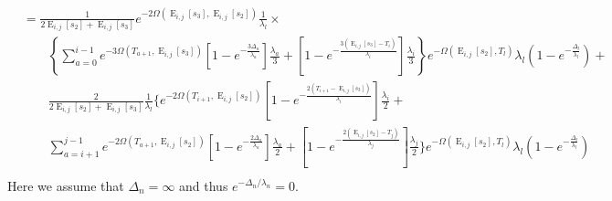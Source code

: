 \documentclass{article}
\DeclareMathOperator{\E}{E}
\begin{document}
\begin{align*}
    &=\frac{1}{2\E_{i,j}[s_2]+\E_{i,j}[s_3]}e^{-2\Omega(\E_{i,j}[s_3],\E_{i,j}[s_2])}\frac{1}{\lambda_l}\times\\
    &\qquad\left\{\sum_{a=0}^{i-1}e^{-3\Omega(T_{a+1},\E_{i,j}[s_3])}
        \left[1-e^{-\frac{3\Delta_a}{\lambda_a}}\right]\frac{\lambda_a}{3}+
    \left[1-e^{-\frac{3\left(\E_{i,j}[s_3]-T_i\right)}{\lambda_i}}\right]
    \frac{\lambda_i}{3}\right\}
    e^{-\Omega(\E_{i,j}[s_2], T_l)}\lambda_l\left(1-e^{-\frac{\Delta_l}{\lambda_l}}\right)+\\
    &\qquad
        \frac{2}{2\E_{i,j}[s_2]+\E_{i,j}[s_3]}\frac{1}{\lambda_l}\Bigg\{e^{-2\Omega(T_{i+1},\E_{i,j}[s_2])}\left[1-e^{-\frac{2\left(T_{i+1}-\E_{i,j}[s_3]\right)}{\lambda_i}}\right]\frac{\lambda_i}{2}+\\
    &\qquad\sum_{a=i+1}^{j-1}e^{-2\Omega\left(T_{a+1},\E_{i,j}[s_2]\right)}\left[1-e^{-\frac{2\Delta_a}{\lambda_a}}\right]\frac{\lambda_a}{2}+
            \left[1-e^{-\frac{2\left(\E_{i,j}[s_2]-T_j\right)}{\lambda_j}}\right]\frac{\lambda_j}{2}
    \Bigg\}
    e^{-\Omega(\E_{i,j}[s_2], T_l)}\lambda_l\left(1-e^{-\frac{\Delta_l}{\lambda_l}}\right)\\
\end{align*}
Here we assume that $\Delta_n = \infty$ and thus $e^{-\Delta_n/\lambda_n} = 0$.
\end{document}
